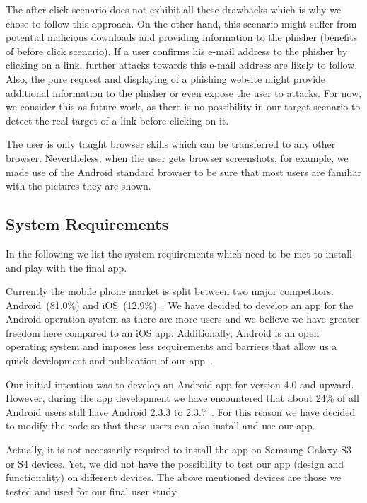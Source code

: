 \begin{description}[leftmargin=0cm]
The after click scenario does not exhibit all these drawbacks which is why we chose to follow this approach.
On the other hand, this scenario might suffer from potential malicious downloads and providing information to the phisher (benefits of before click scenario).
If a user confirms his e-mail address to the phisher by clicking on a link, further attacks towards this e-mail address are likely to follow.
Also, the pure request and displaying of a phishing website might provide additional information to the phisher or even expose the user to attacks.
For now, we consider this as future work, as there is no possibility in our target scenario to detect the real target of a link before clicking on it.

	\item[Considered Browser:] The user is only taught browser skills which can be transferred to any other browser.
Nevertheless, when the user gets browser screenshots, for example, we made use of the Android standard browser to be sure that most users are familiar with the pictures they are shown.
\end{description}	

\subsection{System Requirements}
\label{s:sys_requirements}
In the following we list the system requirements which need to be met to install and play with the final app.


\begin{description}[leftmargin=0cm]
	\item[Android:] Currently the mobile phone market is split between two major competitors. Android~(81.0\%) and iOS~(12.9\%)~\cite{androidiosmarketshare}. 
	We have decided to develop an app for the Android operation system as there are more users and we believe we have greater freedom here compared to an iOS app. 
 	Additionally, Android is an open operating system and imposes less requirements and barriers that allow us a quick development and publication of our app~\cite{publishios, publishandroid}. 
	\item[Version:] Our initial intention was to develop an Android app for version 4.0 and upward.
 However, during the app development we have encountered that about 24\% of all Android users still have Android 2.3.3 to 2.3.7~\cite{versionsandroid}. For this reason we have decided to modify the code so that these users can also install and use our app.
	\item[Samsung Galaxy S3 or S4:] Actually, it is not necessarily required to install the app on Samsung Galaxy S3 or S4 devices. 
Yet, we did not have the possibility to test our app (design and functionality) on different devices.
The above mentioned devices are those we tested and used for our final user study.
\end{description}

